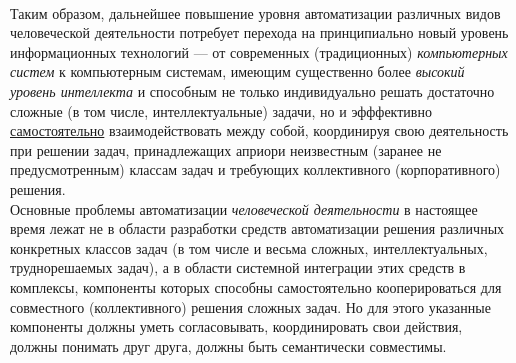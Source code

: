 \begin{scnsubstruct}
\begin{scnindent}
{        \\Таким образом, дальнейшее повышение уровня автоматизации различных видов человеческой деятельности потребует перехода на принципиально новый уровень информационных технологий --- от современных (традиционных) \textit{компьютерных систем} к компьютерным системам, имеющим существенно более \textit{высокий уровень интеллекта} и способным не только индивидуально решать достаточно сложные (в том числе, интеллектуальные) задачи, но и эфффективно \uline{самостоятельно} взаимодействовать между собой, координируя свою деятельность при решении задач, принадлежащих априори неизвестным (заранее не предусмотренным) классам задач и требующих коллективного (корпоративного) решения.
        \\Основные проблемы автоматизации \textit{человеческой деятельности} в настоящее время лежат не в области разработки средств автоматизации решения различных конкретных классов задач (в том числе и весьма сложных, интеллектуальных, труднорешаемых задач), а в области системной интеграции этих средств в комплексы, компоненты которых способны самостоятельно кооперироваться для совместного (коллективного) решения сложных задач. Но для этого указанные компоненты должны уметь согласовывать, координировать свои действия, должны понимать друг друга, должны быть семантически совместимы.}
    \end{scnindent}
    

\end{scnsubstruct}
